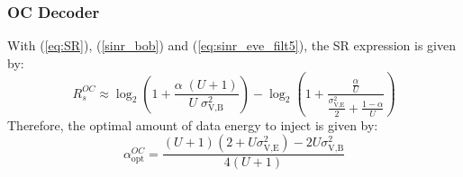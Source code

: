 \documentclass[12pt, draftclsnofoot, onecolumn]{IEEEtran}
\begin{document}
\subsubsection{OC Decoder}
With (\ref{eq:SR}), (\ref{sinr_bob}) and (\ref{eq:sinr_eve_filt5}), the SR expression is given by:
\begin{equation}
R_s^{OC} \approx \log_2 \left( 1 +  \frac{\alpha \;(U+1)}{U \; \sigma_{\text{V,B}}^2} \right) - \log_2\left( 1 +  \frac{\frac{\alpha }{U}}{\frac{\sigma^2_{\text{V,E}}}{2} + \frac{1-\alpha}{U}}\right)
\label{eq:SR_anal2_decod_5}
\end{equation}
Therefore, the optimal amount of data energy to inject is given by:
\begin{equation}
\alpha_{\text{opt}}^{OC} = \frac{(U+1)(2+U\sigma_{\text{V,E}}^2) - 2U\sigma_{\text{V,B}}^2 }{4(U+1)}
\label{eq:optimal_alpha_decod_5}
\end{equation}


\end{document}
